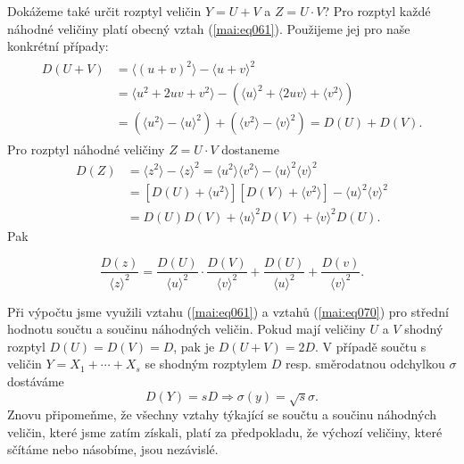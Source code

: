       Dokážeme také určit rozptyl veličin \(Y = U + V\) a \(Z = U\cdot V\)? Pro rozptyl každé 
      náhodné veličiny platí obecný vztah (\ref{mai:eq061}). Použijeme jej pro naše konkrétní 
      případy:
      \begin{gather*}
        \begin{align*}
          D(U + V) &= \langle (u + v)^2 \rangle - \langle u + v \rangle^2                     \\
                   &= \langle u^2 + 2uv + v^2 \rangle - \left(\langle u \rangle^2 +
                      \langle 2uv \rangle + \langle v^2 \rangle\right)                        \\
                   &= \left(\langle u^2\rangle - \langle u \rangle^2\right)
                    + \left(\langle v^2\rangle - \langle v \rangle^2\right) = D(U) + D(V).
        \end{align*}
      \end{gather*}
      Pro rozptyl náhodné veličiny \(Z = U \cdot V\) dostaneme
      \begin{align*}
        D(Z)  &= \langle z^2\rangle - \langle z \rangle^2 
               = \langle u^2\rangle\langle v^2\rangle - \langle u \rangle^2 \langle v \rangle^2  \\
              &= \left[D(U) + \langle u^2\rangle\right]\left[D(V) + \langle v^2\rangle\right]
               - \langle u \rangle^2 \langle v \rangle^2                                         \\
              &= D(U)D(V) + \langle u \rangle^2D(V) + \langle v \rangle^2D(U).
      \end{align*}
      Pak
      \begin{mdframed}[style=highlight]
        \begin{equation*}
          \dfrac{D(z)}{ \langle z \rangle^2} = \dfrac{D(U)}{ \langle u \rangle^2} \cdot
            \dfrac{D(V)}{ \langle v \rangle^2} + \dfrac{D(U)}{ \langle u \rangle^2} +
            \dfrac{D(v)}{ \langle v \rangle^2}.
        \end{equation*}
      \end{mdframed}
      Při výpočtu jsme využili vztahu (\ref{mai:eq061}) a vztahů (\ref{mai:eq070}) pro střední 
      hodnotu součtu a součinu náhodných veličin. Pokud mají veličiny \(U\) a \(V\) shodný rozptyl 
      \(D(U) = D(V) = D\), pak je \(D(U + V) = 2D\). V případě součtu s veličin \(Y = X_1 + \cdots 
      + X_s\) se shodným rozptylem \(D\) resp. směrodatnou odchylkou \(\sigma\) dostáváme
      \begin{equation*}
        D(Y) = sD  \Rightarrow \sigma(y) = \sqrt{s}\sigma.
      \end{equation*}
      Znovu připomeňme, že všechny vztahy týkající se součtu a součinu náhodných veličin, které
      jsme zatím získali, platí za předpokladu, že výchozí veličiny, které sčítáme nebo násobíme, 
      jsou nezávislé.
      
